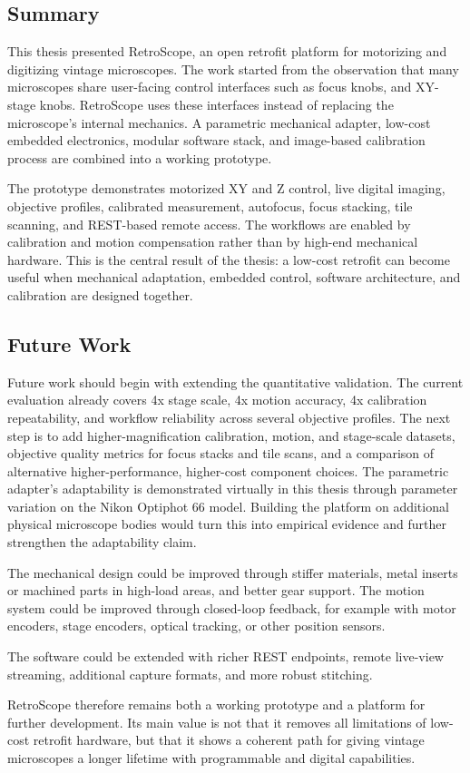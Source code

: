 \subsection{Summary}

This thesis presented RetroScope, an open retrofit platform for motorizing and digitizing vintage microscopes. The work started from the observation that many microscopes share user-facing control interfaces such as focus knobs, and XY-stage knobs. RetroScope uses these interfaces instead of replacing the microscope's internal mechanics. A parametric mechanical adapter, low-cost embedded electronics, modular software stack, and image-based calibration process are combined into a working prototype.

The prototype demonstrates motorized XY and Z control, live digital imaging, objective profiles, calibrated measurement, autofocus, focus stacking, tile scanning, and REST-based remote access. The workflows are enabled by calibration and motion compensation rather than by high-end mechanical hardware. This is the central result of the thesis: a low-cost retrofit can become useful when mechanical adaptation, embedded control, software architecture, and calibration are designed together.

\subsection{Future Work}

Future work should begin with extending the quantitative validation. The current evaluation already covers 4x stage scale, 4x motion accuracy, 4x calibration repeatability, and workflow reliability across several objective profiles. The next step is to add higher-magnification calibration, motion, and stage-scale datasets, objective quality metrics for focus stacks and tile scans, and a comparison of alternative higher-performance, higher-cost component choices. The parametric adapter's adaptability is demonstrated virtually in this thesis through parameter variation on the Nikon Optiphot 66 model. Building the platform on additional physical microscope bodies would turn this into empirical evidence and further strengthen the adaptability claim.

The mechanical design could be improved through stiffer materials, metal inserts or machined parts in high-load areas, and better gear support. The motion system could be improved through closed-loop feedback, for example with motor encoders, stage encoders, optical tracking, or other position sensors.

The software could be extended with richer REST endpoints, remote live-view streaming, additional capture formats, and more robust stitching.

RetroScope therefore remains both a working prototype and a platform for further development. Its main value is not that it removes all limitations of low-cost retrofit hardware, but that it shows a coherent path for giving vintage microscopes a longer lifetime with programmable and digital capabilities.
